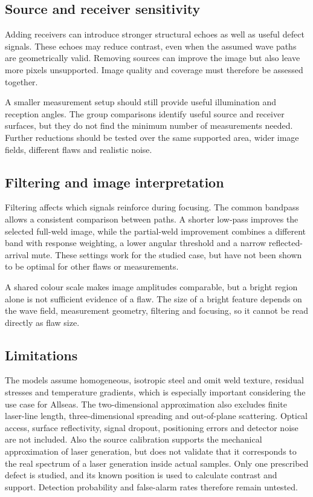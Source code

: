 \subsection{Source and receiver sensitivity}
Adding receivers can introduce stronger structural echoes as well as useful defect signals. These echoes may reduce contrast, even when the assumed wave paths are geometrically valid. Removing sources can improve the image but also leave more pixels unsupported. Image quality and coverage must therefore be assessed together.

A smaller measurement setup should still provide useful illumination and reception angles. The group comparisons identify useful source and receiver surfaces, but they do not find the minimum number of measurements needed. Further reductions should be tested over the same supported area, wider image fields, different flaws and realistic noise. 

\subsection{Filtering and image interpretation}
Filtering affects which signals reinforce during focusing. The common bandpass allows a consistent comparison between paths. A shorter low-pass improves the selected full-weld image, while the partial-weld improvement combines a different band with response weighting, a lower angular threshold and a narrow reflected-arrival mute. These settings work for the studied case, but have not been shown to be optimal for other flaws or measurements.

A shared colour scale makes image amplitudes comparable, but a bright region alone is not sufficient evidence of a flaw. The size of a bright feature depends on the wave field, measurement geometry, filtering and focusing, so it cannot be read directly as flaw size.

\subsection{Limitations}
The models assume homogeneous, isotropic steel and omit weld texture, residual stresses and temperature gradients, which is especially important considering the use case for Allseas. The two-dimensional approximation also excludes finite laser-line length, three-dimensional spreading and out-of-plane scattering. Optical access, surface reflectivity, signal dropout, positioning errors and detector noise are not included. Also the source calibration supports the mechanical approximation of laser generation, but does not validate that it corresponds to the real spectrum of a laser generation inside actual samples. Only one prescribed defect is studied, and its known position is used to calculate contrast and support. Detection probability and false-alarm rates therefore remain untested.

